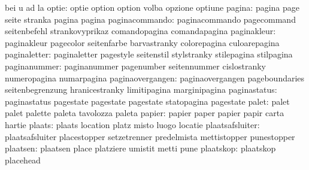                            bei                       u
                           ad                        la
                    optie: optie                     option
                           option                    volba
                           opzione                   optiune
                   pagina: pagina                    page
                           seite                     stranka
                           pagina                    pagina
           paginacommando: paginacommando            pagecommand
                           seitenbefehl              strankovyprikaz
                           comandopagina             comandapagina
              paginakleur: paginakleur               pagecolor
                           seitenfarbe               barvastranky
                           colorepagina              culoarepagina
             paginaletter: paginaletter              pagestyle
                           seitenstil                stylstranky
                           stilepagina               stilpagina
             paginanummer: paginanummer              pagenumber
                           seitennummer              cislostranky
                           numeropagina              numarpagina
         paginaovergangen: paginaovergangen          pageboundaries
                           seitenbegrenzung          hranicestranky
                           limitipagina              marginipagina
             paginastatus: paginastatus              pagestate
                           pagestate                 pagestate
                           statopagina               pagestate %
                    palet: palet                     palet
                           palette                   paleta
                           tavolozza                 paleta
                   papier: papier                    paper
                           papier                    papir
                           carta                     hartie
                   plaats: plaats                    location
                           platz                     misto
                           luogo                     locatie
          plaatsafsluiter: plaatsafsluiter           placestopper
                           setzetrenner              predelmista
                           mettistopper              punestopper %
                 plaatsen: plaatsen                  place
                           platziere                 umistit
                           metti                     pune %
                plaatskop: plaatskop                 placehead
